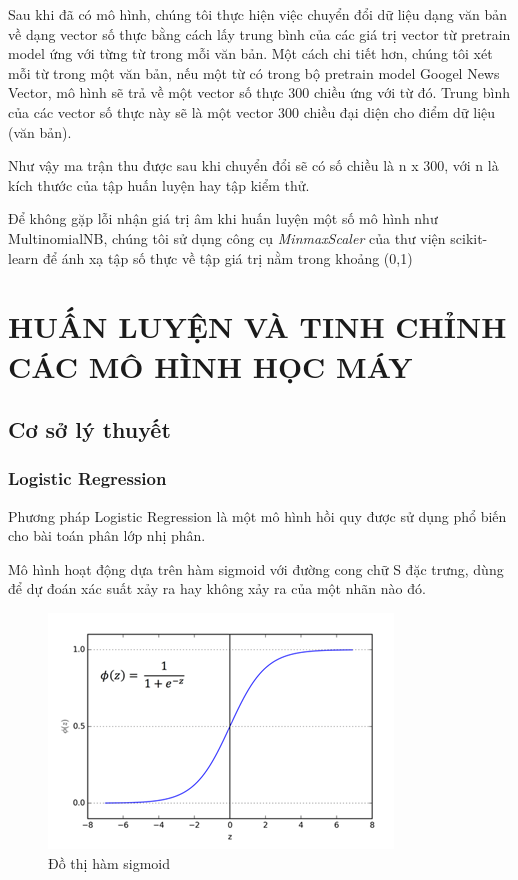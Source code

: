 \documentclass[12pt,a4paper,oneside]{book}
\begin{document}
	Sau khi đã có mô hình, chúng tôi thực hiện việc chuyển đổi dữ liệu dạng văn bản về dạng vector số thực bằng cách lấy trung bình của các giá trị vector từ pretrain model ứng với từng từ trong mỗi văn bản. Một cách chi tiết hơn, chúng tôi xét mỗi từ trong một văn bản, nếu một từ có trong bộ pretrain model Googel News Vector, mô hình sẽ trả về một vector số thực 300 chiều ứng với từ đó. Trung bình của các vector số thực này sẽ là một vector 300 chiều đại diện cho điểm dữ liệu (văn bản).
	
	Như vậy ma trận thu được sau khi chuyển đổi sẽ có số chiều là n x 300, với n là kích thước của tập huấn luyện hay tập kiểm thử.
	
	Để không gặp lỗi nhận giá trị âm khi huấn luyện một số mô hình như MultinomialNB, chúng tôi sử dụng công cụ \textit{MinmaxScaler} của thư viện scikit-learn để ánh xạ tập số thực về tập giá trị nằm trong khoảng (0,1)

\chapter{HUẤN LUYỆN VÀ TINH CHỈNH CÁC MÔ HÌNH HỌC MÁY}
	\section{Cơ sở lý thuyết}
		\subsection{Logistic Regression}
			Phương pháp Logistic Regression là một mô hình hồi quy được sử dụng phổ biến cho bài toán phân lớp nhị phân.

			Mô hình hoạt động dựa trên hàm sigmoid với đường cong chữ S đặc trưng, dùng để dự đoán xác suất xảy ra hay không xảy ra của một nhãn nào đó.
			
			\begin{figure}[H]
				\begin{center}
					\includegraphics[width=0.8\columnwidth]{Picture1}
				\end{center}
				\caption{Đồ thị hàm sigmoid}
			\end{figure}
			
\end{document}
